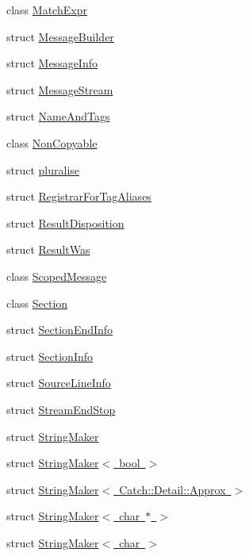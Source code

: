 \begin{DoxyCompactItemize}
\item 
class \mbox{\hyperlink{classCatch_1_1MatchExpr}{Match\+Expr}}
\item 
struct \mbox{\hyperlink{structCatch_1_1MessageBuilder}{Message\+Builder}}
\item 
struct \mbox{\hyperlink{structCatch_1_1MessageInfo}{Message\+Info}}
\item 
struct \mbox{\hyperlink{structCatch_1_1MessageStream}{Message\+Stream}}
\item 
struct \mbox{\hyperlink{structCatch_1_1NameAndTags}{Name\+And\+Tags}}
\item 
class \mbox{\hyperlink{classCatch_1_1NonCopyable}{Non\+Copyable}}
\item 
struct \mbox{\hyperlink{structCatch_1_1pluralise}{pluralise}}
\item 
struct \mbox{\hyperlink{structCatch_1_1RegistrarForTagAliases}{Registrar\+For\+Tag\+Aliases}}
\item 
struct \mbox{\hyperlink{structCatch_1_1ResultDisposition}{Result\+Disposition}}
\item 
struct \mbox{\hyperlink{structCatch_1_1ResultWas}{Result\+Was}}
\item 
class \mbox{\hyperlink{classCatch_1_1ScopedMessage}{Scoped\+Message}}
\item 
class \mbox{\hyperlink{classCatch_1_1Section}{Section}}
\item 
struct \mbox{\hyperlink{structCatch_1_1SectionEndInfo}{Section\+End\+Info}}
\item 
struct \mbox{\hyperlink{structCatch_1_1SectionInfo}{Section\+Info}}
\item 
struct \mbox{\hyperlink{structCatch_1_1SourceLineInfo}{Source\+Line\+Info}}
\item 
struct \mbox{\hyperlink{structCatch_1_1StreamEndStop}{Stream\+End\+Stop}}
\item 
struct \mbox{\hyperlink{structCatch_1_1StringMaker}{String\+Maker}}
\item 
struct \mbox{\hyperlink{structCatch_1_1StringMaker_3_01bool_01_4}{String\+Maker$<$ bool $>$}}
\item 
struct \mbox{\hyperlink{structCatch_1_1StringMaker_3_01Catch_1_1Detail_1_1Approx_01_4}{String\+Maker$<$ Catch\+::\+Detail\+::\+Approx $>$}}
\item 
struct \mbox{\hyperlink{structCatch_1_1StringMaker_3_01char_01_5_01_4}{String\+Maker$<$ char $\ast$ $>$}}
\item 
struct \mbox{\hyperlink{structCatch_1_1StringMaker_3_01char_01_4}{String\+Maker$<$ char $>$}}

\end{DoxyCompactItemize}
